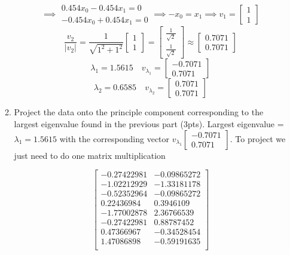 \documentclass[12pt]{article}
\begin{document}
\begin{enumerate}
\begin{enumerate}
$$
\implies
\begin{array}{c}
0.454x_0 -0.454x_1 = 0 \\
-0.454x_0 + 0.454x_1 = 0
\end{array}
\implies -x_0 = x_1 \implies v_1 =
\begin{bmatrix}
1 \\
1
\end{bmatrix}
$$
$$
\frac{v_2}{|v_2|} = \frac{1}{\sqrt{1^2+1^2}} \begin{bmatrix} 1 \\ 1 \end{bmatrix}
= \begin{bmatrix} \frac{1}{\sqrt{2}} \\ \frac{1}{\sqrt{2}} \end{bmatrix}
\approx \begin{bmatrix} 0.7071 \\ 0.7071 \end{bmatrix}
$$
$$ \lambda_1 = 1.5615 \quad v_{\lambda_1} = \begin{bmatrix} -0.7071 \\ 0.7071 \end{bmatrix} $$
$$ \lambda_2 = 0.6585 \quad v_{\lambda_2} = \begin{bmatrix}  0.7071 \\ 0.7071 \end{bmatrix} $$
    \item Project the data onto the principle component corresponding to the largest eigenvalue found in the previous part (3pts).
        \newline
        Largest eigenvalue = $\lambda_1 = 1.5615$ with the corresponding vector $v_{\lambda_1}\begin{bmatrix} -0.7071 \\ 0.7071 \end{bmatrix}$.
        To project we just need to do one matrix multiplication
\begin{center}
$$
 \begin{bmatrix}
-0.27422981 & -0.09865272 \\
-1.02212929 & -1.33181178 \\
-0.52352964 & -0.09865272 \\
 0.22436984 &  0.3946109  \\
-1.77002878 &  2.36766539 \\
-0.27422981 &  0.88787452 \\
 0.47366967 &-0.34528454  \\
 1.47086898 & -0.59191635 \\

\end{bmatrix}$$
\end{center}
\end{enumerate}
\end{enumerate}
\end{document}
